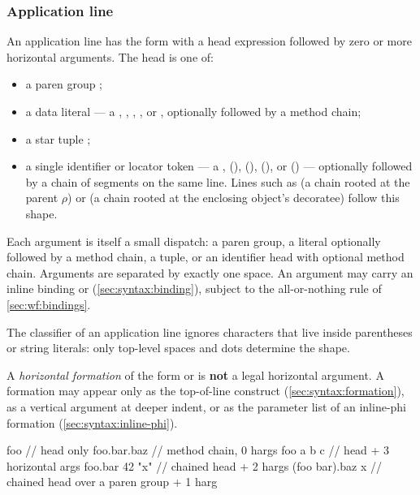 \subsubsection{Application line}\label{sec:syntax:app}

An application line has the form 
  with a head expression followed by zero or more horizontal arguments.
The head is one of:

\begin{itemize}
  \item a paren group \ff{( \ldots )};
  \item a data literal --- a , , , ,
    or , optionally followed by a method chain;
  \item a star tuple \ff{*};
  \item a single identifier or locator token --- a ,
     (),  (\ff{\textasciicircum}), 
    (), or  (\ff{\$}) --- optionally followed by a chain
    of  segments on the same line.
    Lines such as  (a chain rooted at the
    parent \(\rho\)) or  (a chain rooted at the
    enclosing object's decoratee) follow this shape.
\end{itemize}

Each argument is itself a small dispatch:
  a paren group, a literal optionally followed by a method chain,
  a \ff{*} tuple, or an identifier head with optional method chain.
Arguments are separated by exactly one space.
An argument may carry an inline binding  or 
  (\cref{sec:syntax:binding}), subject to the all-or-nothing rule of
  \cref{sec:wf:bindings}.

The classifier of an application line ignores characters that live inside
  parentheses or string literals: only top-level spaces and dots determine the
  shape.

A \emph{horizontal formation} of the form \ff{[x]} or 
  is \textbf{not} a legal horizontal argument.
A formation may appear only as the top-of-line construct
  (\cref{sec:syntax:formation}), as a vertical argument at deeper indent,
  or as the parameter list of an inline-phi formation
  (\cref{sec:syntax:inline-phi}).

\begin{ffcode}
foo                          // head only
foo.bar.baz                  // method chain, 0 hargs
foo a b c                    // head + 3 horizontal args
foo.bar 42 "x"               // chained head + 2 hargs
(foo bar).baz x              // chained head over a paren group + 1 harg
\end{ffcode}

